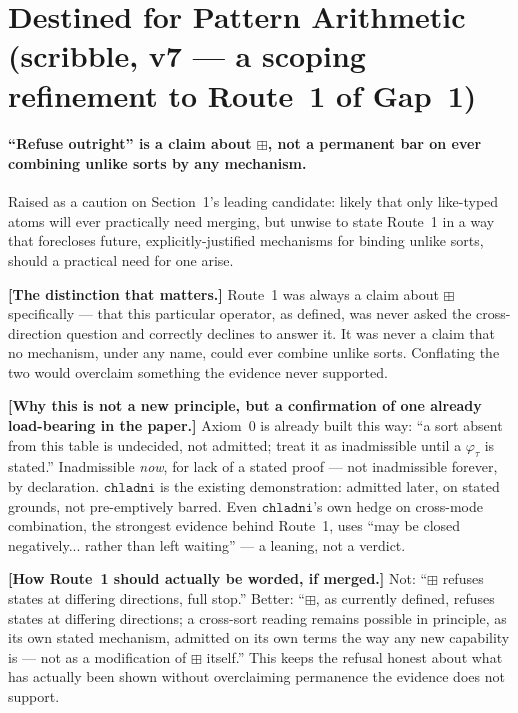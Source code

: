 \documentclass[11pt]{article}
\begin{document}
\section{Destined for Pattern Arithmetic (scribble, v7 --- a scoping
refinement to Route~1 of Gap~1)}

\paragraph{``Refuse outright'' is a claim about $\boxplus$, not a
permanent bar on ever combining unlike sorts by any mechanism.}
Raised as a caution on Section~1's leading candidate: likely that only
like-typed atoms will ever practically need merging, but unwise to
state Route~1 in a way that forecloses future, explicitly-justified
mechanisms for binding unlike sorts, should a practical need for one
arise.

\textbf{[The distinction that matters.]} Route~1 was always a claim
about $\boxplus$ specifically --- that this particular operator, as
defined, was never asked the cross-direction question and correctly
declines to answer it. It was never a claim that no mechanism, under
any name, could ever combine unlike sorts. Conflating the two would
overclaim something the evidence never supported.

\textbf{[Why this is not a new principle, but a confirmation of one
already load-bearing in the paper.]} Axiom~0 is already built this
way: ``a sort absent from this table is undecided, not admitted;
treat it as inadmissible until a $\varphi_\tau$ is stated.''
Inadmissible \emph{now}, for lack of a stated proof --- not
inadmissible forever, by declaration. $\mathtt{chladni}$ is the
existing demonstration: admitted later, on stated grounds, not
pre-emptively barred. Even $\mathtt{chladni}$'s own hedge on
cross-mode combination, the strongest evidence behind Route~1, uses
``may be closed negatively... rather than left waiting'' --- a
leaning, not a verdict.

\textbf{[How Route~1 should actually be worded, if merged.]} Not:
``$\boxplus$ refuses states at differing directions, full stop.''
Better: ``$\boxplus$, as currently defined, refuses states at
differing directions; a cross-sort reading remains possible in
principle, as its own stated mechanism, admitted on its own terms the
way any new capability is --- not as a modification of $\boxplus$
itself.'' This keeps the refusal honest about what has actually been
shown without overclaiming permanence the evidence does not support.
\end{document}
